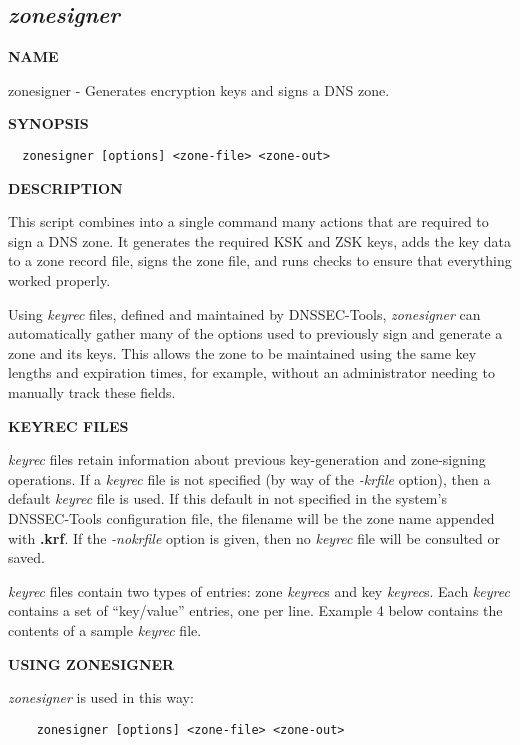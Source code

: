 \clearpage

\subsection{{\it zonesigner}}


{\bf NAME}

zonesigner - Generates encryption keys and signs a DNS zone.

{\bf SYNOPSIS}

\begin{verbatim}  zonesigner [options] <zone-file> <zone-out>\end{verbatim}

{\bf DESCRIPTION}

This script combines into a single command many actions that are required to
sign a DNS zone.  It generates the required KSK and ZSK keys, adds the key
data to a zone record file, signs the zone file, and runs checks to ensure
that everything worked properly.

Using {\it keyrec} files, defined and maintained by DNSSEC-Tools,
{\it zonesigner} can automatically gather many of the options used to previously
sign and generate a zone and its keys.  This allows the zone to be maintained
using the same key lengths and expiration times, for example, without an
administrator needing to manually track these fields.

{\bf KEYREC FILES}

{\it keyrec} files retain information about previous key-generation and
zone-signing operations.  If a {\it keyrec} file is not specified (by way of
the {\it -krfile} option), then a default {\it keyrec} file is used.  If this
default in not specified in the system's DNSSEC-Tools configuration
file, the filename will be the zone name appended with {\bf .krf}.  If the
{\it -nokrfile} option is given, then no {\it keyrec} file will be consulted
or saved.

{\it keyrec} files contain two types of entries:  zone {\it keyrec}s and key
{\it keyrec}s.  Each {\it keyrec} contains a set of ``key/value'' entries,
one per line.  Example 4 below contains the contents of a sample {\it keyrec}
file.

{\bf USING ZONESIGNER}

{\it zonesigner} is used in this way:

\begin{verbatim}    zonesigner [options] <zone-file> <zone-out>\end{verbatim}

